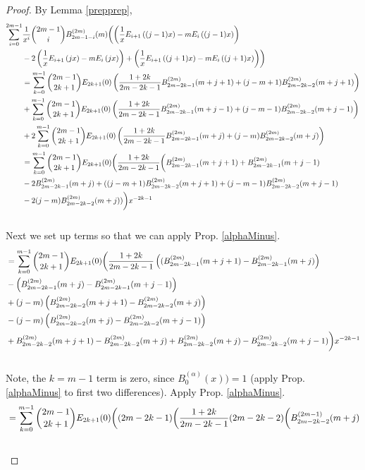 \documentclass[fleqn,a4paper,9pt]{article}
\begin{document}
\begin{flushleft}
\begin{proof}
By Lemma \ref{prepprep}, 
\begin{align}
\sum_{i=0}^{2m-1}&\frac{1}{x^i}\binom{2m-1}{i}B_{2m-1-i}^{(2m)}(m)\biggl(\left(\frac{1}{x}E_{i+1}\left((j-1)x\right)-m E_i\left((j-1)x\right)\right)\\\notag
&-2\left(\frac{1}{x}E_{i+1}\left(j x\right)-m E_i\left(j x\right)\right)+\left(\frac{1}{x}E_{i+1}\left((j+1)x\right)-m E_i\left((j+1)x\right)\right)\biggr)\\\notag
&=\sum_{k=0}^{m-1}\binom{2m-1}{2k+1}E_{2k+1}(0)\left(\frac{1+2k}{2m-2k-1}B_{2m-2k-1}^{(2m)}(m+j+1)+(j-m+1)B_{2m-2k-2}^{(2m)}(m+j+1)\right)\\\notag
&+\sum_{k=0}^{m-1}\binom{2m-1}{2k+1}E_{2k+1}(0)\left(\frac{1+2k}{2m-2k-1}B_{2m-2k-1}^{(2m)}(m+j-1)+(j-m-1)B_{2m-2k-2}^{(2m)}(m+j-1)\right)\\\notag
&+2\sum_{k=0}^{m-1}\binom{2m-1}{2k+1}E_{2k+1}(0)\left(\frac{1+2k}{2m-2k-1}B_{2m-2k-1}^{(2m)}(m+j)+(j-m)B_{2m-2k-2}^{(2m)}(m+j)\right)\\\notag
&=\sum_{k=0}^{m-1}\binom{2m-1}{2k+1}E_{2k+1}(0)\biggl(\frac{1+2k}{2m-2k-1}\biggl(B_{2m-2k-1}^{(2m)}(m+j+1)+B_{2m-2k-1}^{(2m)}(m+j-1)\\\notag
&-2B_{2m-2k-1}^{(2m)}(m+j)+((j-m+1)B_{2m-2k-2}^{(2m)}(m+j+1)+(j-m-1)B_{2m-2k-2}^{(2m)}(m+j-1)\\\notag
&-2(j-m)B_{2m-2k-2}^{(2m)}(m+j))\biggr)x^{-2k-1}\\\notag
\end{align}
Next we set up terms so that we can apply Prop. \ref{alphaMinus}.
\begin{align}\notag
&=\sum_{k=0}^{m-1}\binom{2m-1}{2k+1}E_{2k+1}(0)\biggl(\frac{1+2k}{2m-2k-1}\left((B_{2m-2k-1}^{(2m)}(m+j+1)-B_{2m-2k-1}^{(2m)}(m+j)\right)\\\notag
&-\left(B_{2m-2k-1}^{(2m)}(m+j)-B_{2m-2k-1}^{(2m)}(m+j-1)\right)\\\notag
&+(j-m)\left(B_{2m-2k-2}^{(2m)}(m+j+1)-B_{2m-2k-2}^{(2m)}(m+j)\right)\\\notag
&-(j-m)\left(B_{2m-2k-2}^{(2m)}(m+j)-B_{2m-2k-2}^{(2m)}(m+j-1)\right)\\\notag
&+B_{2m-2k-2}^{(2m)}(m+j+1)-B_{2m-2k-2}^{(2m)}(m+j)+B_{2m-2k-2}^{(2m)}(m+j)-B_{2m-2k-2}^{(2m)}(m+j-1)\biggr)x^{-2k-1}\\\notag
\end{align}
Note, the $k=m-1$ term is zero, since $B_0^{(\alpha)}(x))=1$ (apply Prop. \ref{alphaMinus} to first two differences). Apply Prop. \ref{alphaMinus}.
\begin{align}\notag
&=\sum_{k=0}^{m-1}\binom{2m-1}{2k+1}E_{2k+1}(0)\biggl((2m-2k-1)\biggl(\frac{1+2k}{2m-2k-1}(2m-2k-2)\biggl(B_{2m-2k-2}^{(2m-1)}(m+j)\\\notag

\end{align}
\end{proof}
\end{flushleft}
\end{document}
